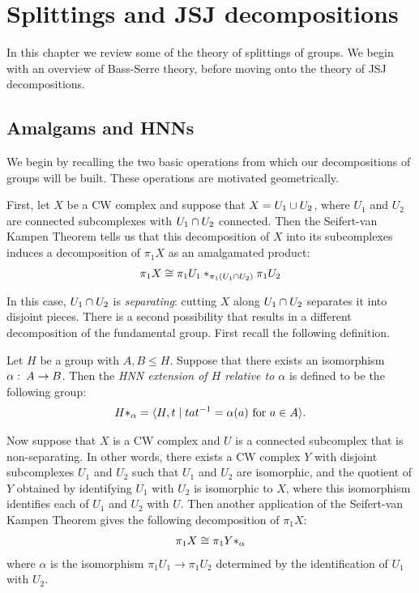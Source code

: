 \chapter{Splittings and JSJ decompositions}\label{chapter:splittings_and_JSJs}

In this chapter we review some of the theory of splittings of groups.
We begin with an overview of Bass-Serre theory, before moving onto the theory of JSJ decompositions.

\section{Amalgams and HNNs}

We begin by recalling the two basic operations from which our decompositions of groups will be built. 
These operations are motivated geometrically. 

First, let $X$ be a CW complex and suppose that $X = U_1 \cup U_2$, where $U_1$ and $U_2$ are connected subcomplexes with $U_1 \cap U_2$ connected.
Then the Seifert-van Kampen Theorem tells us that this decomposition of $X$ into its subcomplexes induces a decomposition of $\pi_1 X$ as an amalgamated product:
\begin{align*}
  \pi_1X \cong \pi_1U_1 \ast_{\pi_1(U_1 \cap U_2)} \pi_1U_2
\end{align*}

In this case, $U_1 \cap U_2$ is \emph{separating}: cutting $X$ along $U_1 \cap U_2$ separates it into disjoint pieces. 
There is a second possibility that results in a different decomposition of the fundamental group.
First recall the following definition.

\begin{definition}
  Let $H$ be a group with $A, B \leq H$.
  Suppose that there exists an isomorphism $\alpha\operatorname{\colon} A \to B$.
  Then the \emph{HNN extension of $H$ relative to $\alpha$} is defined to be the following group:
  \begin{align*}
    H \ast_{\alpha} = \langle H, t \mid tat^{-1} = \alpha(a)\text{ for $a \in A$}\rangle.
  \end{align*}
\end{definition}

Now suppose that $X$ is a CW complex and $U$ is a connected subcomplex that is non-separating.
In other words, there exists a CW complex $Y$ with disjoint subcomplexes $U_1$ and $U_2$ such that $U_1$ and $U_2$ are isomorphic, and the quotient of $Y$ obtained by identifying $U_1$ with $U_2$ is isomorphic to $X$, where this isomorphism identifies each of $U_1$ and $U_2$ with $U$.
Then another application of the Seifert-van Kampen Theorem gives the following decomposition of $\pi_1X$:
\begin{align*}
  \pi_1X \cong \pi_1Y \ast_{\alpha}
\end{align*}
where $\alpha$ is the isomorphism $\pi_1U_1 \to \pi_1U_2$ determined by the identification of $U_1$ with $U_2$.

